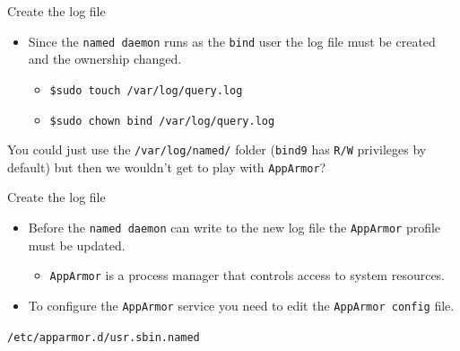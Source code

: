 \documentclass[xcolor=table,aspectratio=169]{beamer}
\begin{document}
\begin{frame}{Create the log file}
  \begin{itemize}
    \item Since the \texttt{named daemon} runs as the \texttt{bind} user the log file must be created and the ownership changed.
      \begin{itemize}
        \item \texttt{\$sudo touch /var/log/query.log }
        \item \texttt{\$sudo chown bind /var/log/query.log}
      \end{itemize}
  \end{itemize}
  \begin{tcolorbox}[title={\textbf{NOTE:}}]
      \begin{center}
        You could just use the \texttt{/var/log/named/} folder (\texttt{bind9} has \texttt{R/W} privileges by default) but then we wouldn't get to play with \texttt{AppArmor}?        
      \end{center}
  \end{tcolorbox}
\end{frame}

\begin{frame}{Create the log file}
  \begin{itemize}
    \item Before the \texttt{named daemon} can write to the new log file the \texttt{AppArmor} profile must be updated.
      \begin{itemize}
        \item \texttt{AppArmor} is a process manager that controls access to system resources.
      \end{itemize}
    \item To configure the \texttt{AppArmor} service you need to edit the \texttt{AppArmor config} file.
  \end{itemize}
  \begin{tcolorbox}
      \begin{center}
        \texttt{/etc/apparmor.d/usr.sbin.named}
      \end{center}
  \end{tcolorbox}
\end{frame}
\end{document}
